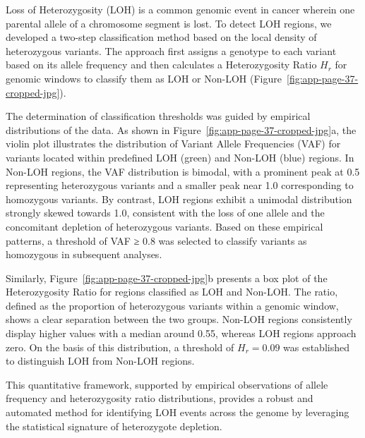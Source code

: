 \documentclass[pdflatex,sn-nature]{sn-jnl}
\begin{document}
Loss of Heterozygosity (LOH) is a common genomic event in cancer wherein one parental allele of a chromosome segment is lost. To detect LOH regions, we developed a two-step classification method based on the local density of heterozygous variants. The approach first assigns a genotype to each variant based on its allele frequency and then calculates a Heterozygosity Ratio \(H_r\) for genomic windows to classify them as LOH or Non-LOH (Figure~\ref{fig:app-page-37-cropped-jpg}).

The determination of classification thresholds was guided by empirical distributions of the data. As shown in Figure~\ref{fig:app-page-37-cropped-jpg}a, the violin plot illustrates the distribution of Variant Allele Frequencies (VAF) for variants located within predefined LOH (green) and Non-LOH (blue) regions. In Non-LOH regions, the VAF distribution is bimodal, with a prominent peak at 0.5 representing heterozygous variants and a smaller peak near 1.0 corresponding to homozygous variants. By contrast, LOH regions exhibit a unimodal distribution strongly skewed towards 1.0, consistent with the loss of one allele and the concomitant depletion of heterozygous variants. Based on these empirical patterns, a threshold of VAF ≥ 0.8 was selected to classify variants as homozygous in subsequent analyses.

Similarly, Figure~\ref{fig:app-page-37-cropped-jpg}b presents a box plot of the Heterozygosity Ratio for regions classified as LOH and Non-LOH. The ratio, defined as the proportion of heterozygous variants within a genomic window, shows a clear separation between the two groups. Non-LOH regions consistently display higher values with a median around 0.55, whereas LOH regions approach zero. On the basis of this distribution, a threshold of $H_r = 0.09$ was established to distinguish LOH from Non-LOH regions.

This quantitative framework, supported by empirical observations of allele frequency and heterozygosity ratio distributions, provides a robust and automated method for identifying LOH events across the genome by leveraging the statistical signature of heterozygote depletion.
\end{document}
